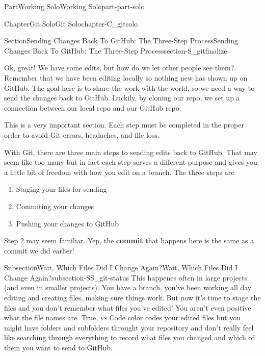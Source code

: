 \documentclass[twoside,10pt,]{book}
\newcommand{\initialism}[1]{\textsc{\MakeLowercase{#1}}}
\newcommand{\terminology}[1]{\textbf{#1}}
\begin{document}
\begin{partptx}{Part}{Working Solo}{}{Working Solo}{}{}{part-part-solo}
\begin{chapterptx}{Chapter}{Git Solo}{}{Git Solo}{}{}{chapter-C_gitsolo}
%
%
\typeout{************************************************}
\typeout{************************************************}
%
\begin{sectionptx}{Section}{Sending Changes Back To GitHub: The Three-Step Process}{}{Sending Changes Back To GitHub: The Three-Step Process}{}{}{section-S_gitfinalize}
%
%
\begin{introduction}{}%
Ok, great! We have some edits, but how do we let other people see them? Remember that we have been editing locally so nothing new has shown up on GitHub. The goal here is to share the work with the world, so we need a way to send the changes back to GitHub. Luckily, by cloning our repo, we set up a connection between our local repo and our GitHub repo.%
\par
This is a very important section. Each step must be completed in the proper order to avoid Git errors, headaches, and file loss.%
\par
With Git, there are three main steps to sending edits back to GitHub. That may seem like too many but in fact each step serves a different purpose and gives you a little bit of freedom with how you edit on a branch. The three steps are%
\begin{enumerate}
\item{}Staging your files for sending%
\item{}Commiting your changes%
\item{}Pushing your changes to GitHub%
\end{enumerate}
Step 2 may seem familiar. Yep, the \terminology{commit} that happens here is the same as a commit we did earlier!%
\end{introduction}%
%
%
\typeout{************************************************}
\typeout{************************************************}
%
\begin{subsectionptx}{Subsection}{Wait, Which Files Did I Change Again?}{}{Wait, Which Files Did I Change Again?}{}{}{subsection-SS_git-status}
%
This happenes often in large projects (and even in smaller projects). You have a branch, you've been working all day editing and creating files, making sure things work. But now it's time to stage the files and you don't remember what files you've edited! You aren't even positive what the file names are. True, \initialism{VS} Code color codes your edited files but you might have folders and subfolders throught your repository and don't really feel like searching through everything to record what files you changed and which of them you want to send to GitHub.%

\end{subsectionptx}
\end{sectionptx}
\end{chapterptx}
\end{partptx}
\end{document}
